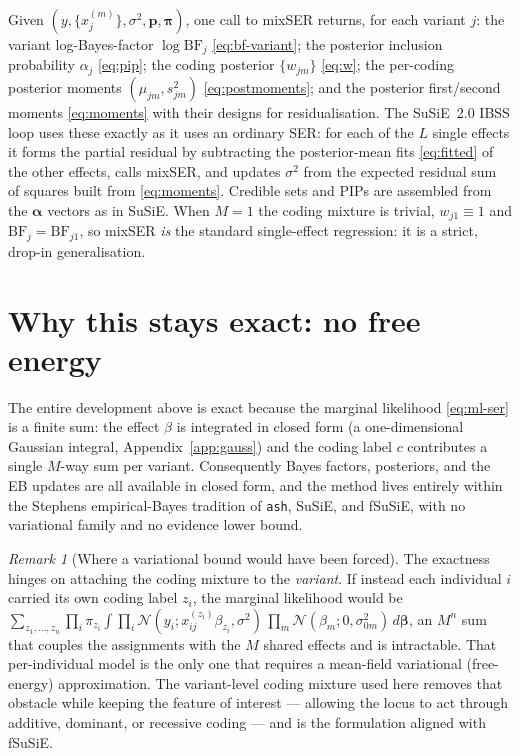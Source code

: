 \documentclass[11pt]{article}
\newcommand{\Nor}{\mathcal{N}}
\newcommand{\sigsq}{\sigma^{2}}
\newcommand{\sigz}[1]{\sigma_{0#1}^{2}}
\newcommand{\BF}{\mathrm{BF}}
\newcommand{\xjm}{x_j^{(m)}}
\theoremstyle{plain}
\theoremstyle{remark}
\newtheorem{remark}{Remark}
\begin{document}
Given $(y,\{\xjm\},\sigsq,\bm p,\bm\pi)$, one call to mixSER returns, for each
variant $j$: the variant log-Bayes-factor $\log\BF_j$ \eqref{eq:bf-variant}; the
posterior inclusion probability $\alpha_j$ \eqref{eq:pip}; the coding posterior
$\{w_{jm}\}$ \eqref{eq:w}; the per-coding posterior moments
$(\mu_{jm},s_{jm}^{2})$ \eqref{eq:postmoments}; and the posterior first/second
moments \eqref{eq:moments} with their designs for residualisation. The SuSiE~2.0
IBSS loop uses these exactly as it uses an ordinary SER: for each of the $L$
single effects it forms the partial residual by subtracting the posterior-mean
fits \eqref{eq:fitted} of the other effects, calls mixSER, and updates $\sigsq$
from the expected residual sum of squares built from \eqref{eq:moments}. Credible
sets and PIPs are assembled from the $\bm\alpha$ vectors as in SuSiE. When $M=1$
the coding mixture is trivial, $w_{j1}\equiv1$ and
$\BF_j=\BF_{j1}$, so mixSER \emph{is} the standard single-effect regression: it is
a strict, drop-in generalisation.

\section{Why this stays exact: no free energy}\label{sec:noelbo}

The entire development above is exact because the marginal likelihood
\eqref{eq:ml-ser} is a finite sum: the effect $\beta$ is integrated in closed
form (a one-dimensional Gaussian integral, Appendix~\ref{app:gauss}) and the
coding label $c$ contributes a single $M$-way sum per variant. Consequently
Bayes factors, posteriors, and the EB updates are all available in closed form,
and the method lives entirely within the Stephens empirical-Bayes tradition of
\texttt{ash}, SuSiE, and fSuSiE, with no variational family and no evidence lower
bound.

\begin{remark}[Where a variational bound would have been forced]
The exactness hinges on attaching the coding mixture to the \emph{variant}. If
instead each individual $i$ carried its own coding label $z_i$, the marginal
likelihood would be
$\sum_{z_1,\dots,z_n}\prod_i \pi_{z_i}\int\prod_i\Nor(y_i;x_{ij}^{(z_i)}\beta_{z_i},\sigsq)\,
 \prod_m\Nor(\beta_m;0,\sigz{m})\,d\bm\beta$,
an $M^{n}$ sum that couples the assignments with the $M$ shared effects and is
intractable. That per-individual model is the only one that requires a mean-field
variational (free-energy) approximation. The variant-level coding mixture used
here removes that obstacle while keeping the feature of interest --- allowing the
locus to act through additive, dominant, or recessive coding --- and is the
formulation aligned with fSuSiE.
\end{remark}
\end{document}

